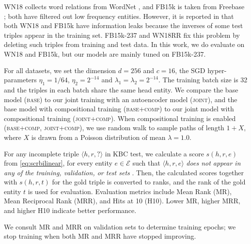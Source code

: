\documentclass[11pt,a4paper]{article}
\newcommand{\setofents}{\mathcal{E}}
\newcommand{\mtriple}[3]{\langle #1, #2, #3 \rangle}
\begin{document}
WN18 collects word relations from 
WordNet \citep{DBLP:journals/cacm/Miller95}, and FB15k is taken from 
Freebase \citep{DBLP:conf/sigmod/BollackerEPST08}; both have filtered out low 
frequency entities. However, it is reported in \citet{toutanova-chen:2015:CVSC} that 
both WN18 and FB15k have information leaks because 
the inverses of some test triples appear in the training set. 
FB15k-237 and WN18RR fix this problem by deleting such triples from training 
and test data. In this work, we do evaluate on WN18 and FB15k, but our models 
are mainly tuned on FB15k-237. 

For all datasets, we set the dimension $d=256$ and $c=16$, the SGD 
hyper-parameters $\eta_1=1/64$, 
$\eta_2=2^{-14}$ and $\lambda_1=\lambda_2=2^{-14}$. The training batch size 
is 32 and the triples in each batch share the same head entity. 
We compare the base model (\textsc{base}) to our joint training 
with an autoencoder model (\textsc{joint}), and the base 
model with compositional training (\textsc{base+comp}) to our
joint model with compositional training (\textsc{joint+comp}). 
When compositional training is 
enabled (\textsc{base+comp}, \textsc{joint+comp}), 
we use random walk to sample paths of length $1+X$, where $X$ is drawn from a Poisson 
distribution of mean $\lambda=1.0$.


For any incomplete triple $\mtriple{h}{r}{?}$ in KBC test, we calculate 
a score $s(h,r,e)$ from \eqref{eq:scrbilinear}, for 
every entity $e\in\setofents$ such that $\mtriple{h}{r}{e}$ 
\emph{does not appear in any of the training, validation, or test sets}
\citep{DBLP:conf/nips/BordesUGWY13}. 
Then, the calculated scores together with $s(h,r,t)$ for the gold triple 
is converted to ranks, and the rank of the gold entity $t$ is used for 
evaluation. Evaluation metrics include Mean Rank (MR),
Mean Reciprocal Rank (MRR), and
Hits at 10 (H10). 
Lower MR, higher MRR, and higher H10 indicate better performance.

We consult MR and MRR on validation sets to determine training epochs; we stop 
training when both MR and MRR have stopped improving. 
\end{document}
